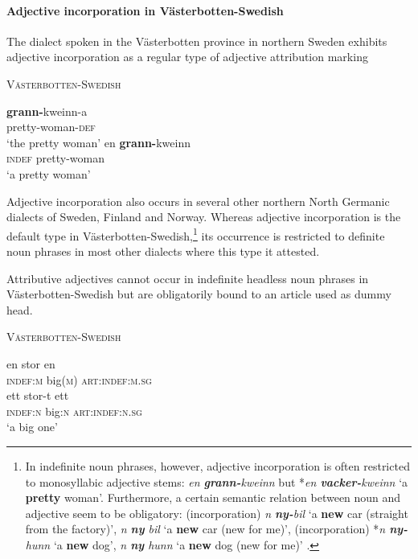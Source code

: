 \paragraph{Adjective incorporation in Västerbotten-Swedish} \label{bondska synchr}
The dialect spoken in the Västerbotten province in northern Sweden exhibits adjective incorporation as a regular type of adjective attribution marking
\begin{exe}
\ex \textsc{Västerbotten-Swedish} \citep[91–92]{holmberg-etal2003}
\begin{xlist}
\ex
\gll 	\textbf{grann-}kweinn-a\\	
	pretty-woman-\textsc{def}\\
\glt	‘the pretty woman’
\ex
\gll	en \textbf{grann-}kweinn\\
	\textsc{indef} pretty-woman\\
\glt	‘a pretty woman’
\end{xlist}
\end{exe}
Adjective incorporation also occurs in several other northern North Germanic dialects of Sweden, Finland and Norway. Whereas adjective incorporation is the default type in Västerbotten-Swedish,\footnote{In indefinite noun phrases, however, adjective incorporation is often restricted to monosyllabic adjective stems: \textit{en \textbf{grann-}kweinn} but *\textit{en \textbf{vacker-}kweinn} ‘a \textbf{pretty} woman’. Furthermore, a certain semantic relation between noun and adjective seem to be obligatory: (incorporation) \textit{n \textbf{ny-}bil} ‘a \textbf{new} car (straight from the factory)’, \textit{n \textbf{ny} bil} ‘a \textbf{new} car (new for me)’, (incorporation) *\textit{n \textbf{ny-}hunn} ‘a \textbf{new} dog’, \textit{n \textbf{ny} hunn} ‘a \textbf{new} dog (new for me)’ \cite[91–92]{holmberg-etal2003}.} its occurrence is restricted to definite noun phrases in most other dialects where this type it attested.

Attributive adjectives cannot occur in indefinite headless noun phrases in Västerbotten-Swedish but are obligatorily bound to an article used as dummy head.
\begin{exe}
\ex  \textsc{Västerbotten-Swedish} \citep{holmberg-etal2003,delsing1996}
\begin{xlist}
\ex
\gll 	en stor en\\	
	\textsc{indef:m} big(\textsc{m}) \textsc{art:indef:m.sg}\\
\ex
\gll 	ett stor-t ett\\	
	\textsc{indef:n} big:\textsc{n} \textsc{art:indef:n.sg}\\
\glt	‘a big one’
\end{xlist}
\end{exe}

